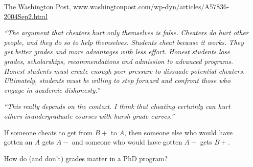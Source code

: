 \documentclass[12pt]{beamer}
\newcommand\ans[1]{{\it ``#1''}}
\newcommand\gap{\vspace{5mm}}
\begin{document}
\begin{frame}

The Washington Post, \url{www.washingtonpost.com/wp-dyn/articles/A57836-2004Sep2.html}

{\it
``The argument that cheaters hurt only themselves is false. Cheaters do hurt other people, and they do so to help themselves. Students cheat because it works. They get better grades and more advantages with less effort. Honest students lose grades, scholarships, recommendations and admission to advanced programs. Honest students must create enough peer pressure to dissuade potential cheaters. Ultimately, students must be willing to step forward and confront those who engage in academic dishonesty.''
}

\end{frame}
\begin{frame}



\ans{This really depends on the context.  I think that cheating certainly can hurt others inundergraduate courses with harsh grade curves.}

\gap

If someone cheats to get from $B+$ to $A$, then someone else who would have gotten an $A$ gets $A-$ and someone who would have gotten $A-$ gets $B+$.

\gap

How do (and don't) grades matter in a PhD program?

\end{frame}
\end{document}
